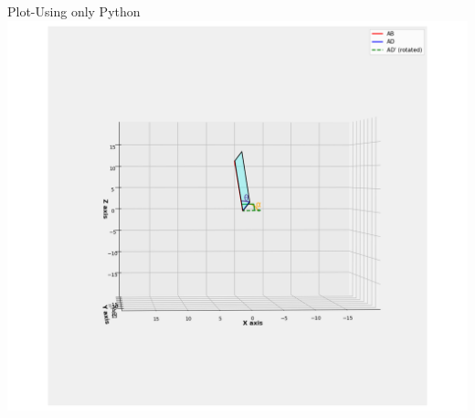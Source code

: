 \documentclass{beamer}
\begin{document}
\begin{frame}{Plot-Using only Python}
    \centering
    \includegraphics[width=\columnwidth, height=0.8\textheight, keepaspectratio]{figs/plot2.png}     
\end{frame}
\end{document}
